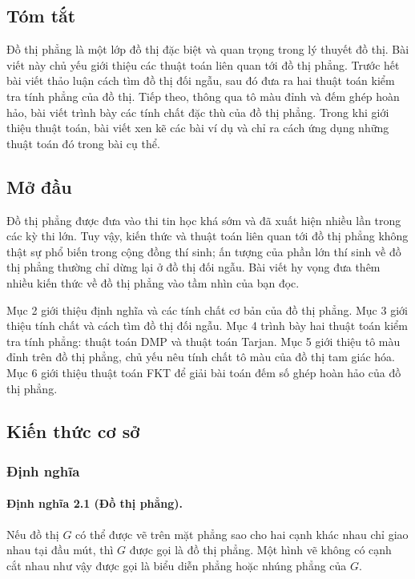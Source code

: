 \documentclass[11pt]{article}
\begin{document}
\subsection*{Tóm tắt}

Đồ thị phẳng là một lớp đồ thị đặc biệt và quan trọng trong lý thuyết đồ thị.
Bài viết này chủ yếu giới thiệu các thuật toán liên quan tới đồ thị phẳng.
Trước hết bài viết thảo luận cách tìm đồ thị đối ngẫu, sau đó đưa ra hai thuật
toán kiểm tra tính phẳng của đồ thị. Tiếp theo, thông qua tô màu đỉnh và đếm
ghép hoàn hảo, bài viết trình bày các tính chất đặc thù của đồ thị phẳng. Trong
khi giới thiệu thuật toán, bài viết xen kẽ các bài ví dụ và chỉ ra cách ứng
dụng những thuật toán đó trong bài cụ thể.

\subsection{Mở đầu}

Đồ thị phẳng được đưa vào thi tin học khá sớm và đã xuất hiện nhiều lần trong
các kỳ thi lớn. Tuy vậy, kiến thức và thuật toán liên quan tới đồ thị phẳng
không thật sự phổ biến trong cộng đồng thí sinh; ấn tượng của phần lớn thí sinh
về đồ thị phẳng thường chỉ dừng lại ở đồ thị đối ngẫu. Bài viết hy vọng đưa
thêm nhiều kiến thức về đồ thị phẳng vào tầm nhìn của bạn đọc.

Mục 2 giới thiệu định nghĩa và các tính chất cơ bản của đồ thị phẳng. Mục 3
giới thiệu tính chất và cách tìm đồ thị đối ngẫu. Mục 4 trình bày hai thuật
toán kiểm tra tính phẳng: thuật toán DMP và thuật toán Tarjan. Mục 5 giới thiệu
tô màu đỉnh trên đồ thị phẳng, chủ yếu nêu tính chất tô màu của đồ thị tam giác
hóa. Mục 6 giới thiệu thuật toán FKT để giải bài toán đếm số ghép hoàn hảo của
đồ thị phẳng.

\subsection{Kiến thức cơ sở}

\subsubsection{Định nghĩa}

\paragraph{Định nghĩa 2.1 (Đồ thị phẳng).}
Nếu đồ thị $G$ có thể được vẽ trên mặt phẳng sao cho hai cạnh khác nhau chỉ
giao nhau tại đầu mút, thì $G$ được gọi là đồ thị phẳng. Một hình vẽ không có
cạnh cắt nhau như vậy được gọi là biểu diễn phẳng hoặc nhúng phẳng của $G$.
\end{document}
